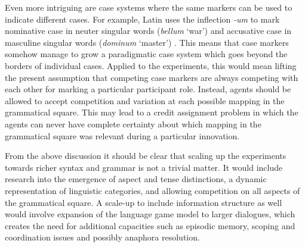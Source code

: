 Even more intriguing are case systems where the same markers can be used to indicate different cases. For example, Latin uses the inflection {\em -um} to mark nominative case in neuter singular words ({\em bellum} `war') and accusative case in masculine singular words ({\em dominum} `master') \citep[4--5]{blake94case}. This means that case markers somehow manage to grow a paradigmatic case system which goes beyond the borders of individual cases. Applied to the experiments, this would mean lifting the present assumption that competing case markers are always competing with each other for marking a particular participant role. Instead, agents should be allowed to accept competition and variation at each possible mapping in the grammatical square. This may lead to a credit assignment problem in which the agents can never have complete certainty about which mapping in the grammatical square was relevant during a particular innovation.

From the above discussion it should be clear that scaling up the experiments towards richer syntax and grammar is not a trivial matter. It would include research into the emergence of aspect and tense distinctions, a dynamic representation of linguistic categories, and allowing competition on all aspects of the grammatical square. A scale-up to include information structure as well would involve expansion of the language game model to larger dialogues, which creates the need for additional capacities such as episodic memory, scoping and coordination issues and possibly anaphora resolution.